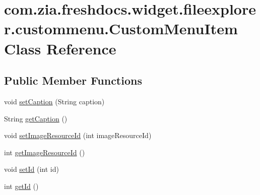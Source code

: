 \hypertarget{classcom_1_1zia_1_1freshdocs_1_1widget_1_1fileexplorer_1_1custommenu_1_1_custom_menu_item}{\section{com.\-zia.\-freshdocs.\-widget.\-fileexplorer.\-custommenu.\-Custom\-Menu\-Item Class Reference}
\label{classcom_1_1zia_1_1freshdocs_1_1widget_1_1fileexplorer_1_1custommenu_1_1_custom_menu_item}
}
\subsection*{Public Member Functions}
\begin{DoxyCompactItemize}
\item 
void \hyperlink{classcom_1_1zia_1_1freshdocs_1_1widget_1_1fileexplorer_1_1custommenu_1_1_custom_menu_item_a293367f1d3e63c3380d02a9c70cbb29c}{set\-Caption} (String caption)
\item 
String \hyperlink{classcom_1_1zia_1_1freshdocs_1_1widget_1_1fileexplorer_1_1custommenu_1_1_custom_menu_item_a4ee6b7968da238f7f5e86d90357ed3eb}{get\-Caption} ()
\item 
void \hyperlink{classcom_1_1zia_1_1freshdocs_1_1widget_1_1fileexplorer_1_1custommenu_1_1_custom_menu_item_adbb7c5f4868591c39f2b68116758dd56}{set\-Image\-Resource\-Id} (int image\-Resource\-Id)
\item 
int \hyperlink{classcom_1_1zia_1_1freshdocs_1_1widget_1_1fileexplorer_1_1custommenu_1_1_custom_menu_item_aba5116ffa09499599f446168f8027fad}{get\-Image\-Resource\-Id} ()
\item 
void \hyperlink{classcom_1_1zia_1_1freshdocs_1_1widget_1_1fileexplorer_1_1custommenu_1_1_custom_menu_item_a6066a090d8c143b19d345d9c1ce9793e}{set\-Id} (int id)
\item 
int \hyperlink{classcom_1_1zia_1_1freshdocs_1_1widget_1_1fileexplorer_1_1custommenu_1_1_custom_menu_item_aedef5de355ae626f52fd3f9e0b6709ce}{get\-Id} ()
\end{DoxyCompactItemize}


